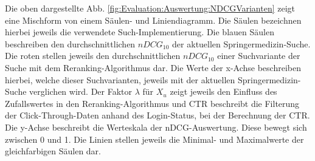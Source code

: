 \begin{figure}[H]


\vspace{-2.5em}
\end{figure}

Die oben dargestellte Abb. \ref{fig:Evaluation:Auswertung:NDCGVarianten} zeigt eine Mischform von einem Säulen- und Liniendiagramm. Die Säulen bezeichnen hierbei jeweils die verwendete Such-Implementierung. Die blauen Säulen beschreiben den durchschnittlichen $nDCG_10$ der aktuellen Springermedizin-Suche. Die roten stellen jeweils den durchschnittlichen $nDCG_10$  einer Suchvariante der Suche mit dem Reranking-Algorithmus dar. Die Werte der x-Achse beschreiben hierbei, welche dieser Suchvarianten, jeweils mit der aktuellen Springermedizin-Suche verglichen wird. Der Faktor $\lambda$ für $X_u$ zeigt jeweils den Einfluss des Zufallswertes in den Reranking-Algorithmus und CTR beschreibt die Filterung der Click-Through-Daten anhand des Login-Status, bei der Berechnung der CTR. Die y-Achse beschreibt die Werteskala der nDCG-Auswertung. Diese bewegt sich zwischen 0 und 1. Die Linien stellen jeweils die Minimal- und Maximalwerte der gleichfarbigen Säulen dar.

